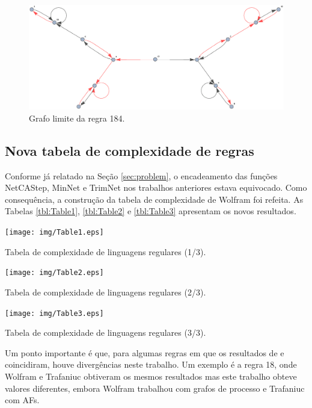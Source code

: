 \documentclass[12pt,a4paper]{article}
\begin{document}
\begin{figure}[htp]
\begin{center}
\includegraphics[scale=0.55]{img/limit184w.eps}
\caption{Grafo limite da regra 184.}
\label{fig:limit184w}
\end{center}
\end{figure}

\subsection{Nova tabela de complexidade de regras}\label{sec:table}

Conforme já relatado na Seção \ref{sec:problem}, o encadeamento das
funções NetCAStep, MinNet e TrimNet nos trabalhos anteriores estava
equivocado. Como consequência, a construção da tabela de complexidade
de Wolfram foi refeita. As Tabelas \ref{tbl:Table1}, \ref{tbl:Table2}
e \ref{tbl:Table3} apresentam os novos resultados.

\begin{table}
\centering
\texttt{[image: img/Table1.eps]}
\caption{Tabela de complexidade de linguagens regulares (1/3).}
\label{tbl:Table1}
\end{table}

\begin{table}
\centering
\texttt{[image: img/Table2.eps]}
\caption{Tabela de complexidade de linguagens regulares (2/3).}
\label{tbl:Table2}
\end{table}

\begin{table}
\centering
\texttt{[image: img/Table3.eps]}
\caption{Tabela de complexidade de linguagens regulares (3/3).}
\label{tbl:Table3}
\end{table}

Um ponto importante é que, para algumas regras em que os resultados de
 e  coincidiram, houve
divergências neste trabalho. Um exemplo é a regra 18, onde Wolfram e
Trafaniuc obtiveram os mesmos resultados mas este trabalho obteve valores
diferentes, embora Wolfram trabalhou com grafos de processo e Trafaniuc
com AFs.
\end{document}
